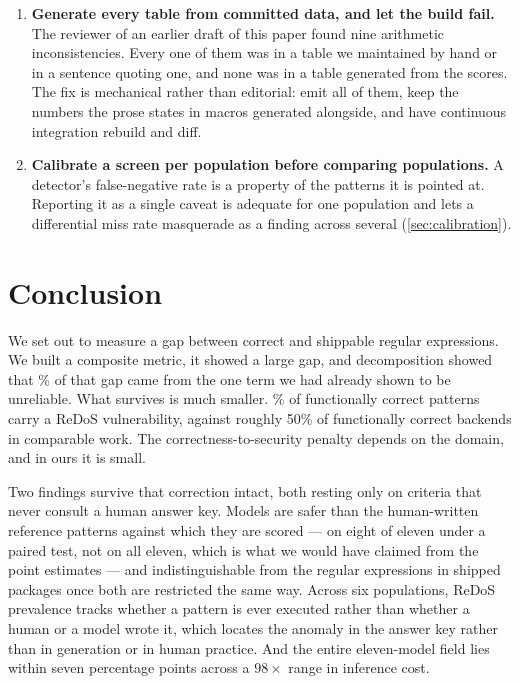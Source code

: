 \documentclass[11pt]{article}
\begin{document}
\begin{enumerate}
\item \textbf{Generate every table from committed data, and let the build
fail.} The reviewer of an earlier draft of this paper found nine arithmetic
inconsistencies. Every one of them was in a table we maintained by hand or in
a sentence quoting one, and none was in a table generated from the scores.
The fix is mechanical rather than editorial: emit all of them, keep the
numbers the prose states in macros generated alongside, and have continuous
integration rebuild and diff.

\item \textbf{Calibrate a screen per population before comparing
populations.} A detector's false-negative rate is a property of the patterns
it is pointed at. Reporting it as a single caveat is adequate for one
population and lets a differential miss rate masquerade as a finding across
several (\cref{sec:calibration}).
\end{enumerate}

\section{Conclusion}

We set out to measure a gap between correct and shippable regular
expressions. We built a composite metric, it showed a large gap, and
decomposition showed that \equivshare{}\% of that gap came from the one term we had
already shown to be unreliable. What survives is much smaller. \vulngivencorrect{}\% of
functionally correct patterns carry a ReDoS vulnerability, against roughly
50\% of functionally correct backends in comparable work. The
correctness-to-security penalty depends on the domain, and in ours it is
small.

Two findings survive that correction intact, both resting only on criteria
that never consult a human answer key. Models are safer than the
human-written reference patterns against which they are scored --- on eight of
eleven under a paired test, not on all eleven, which is what we would have
claimed from the point estimates --- and indistinguishable from the regular
expressions in shipped packages once both are restricted the same way. Across
six populations, ReDoS prevalence tracks whether a pattern is ever executed
rather than whether a human or a model wrote it, which locates the anomaly in
the answer key rather than in generation or in human practice. And the entire
eleven-model field lies within seven percentage points across a $98\times$
range in inference cost.
\end{document}
